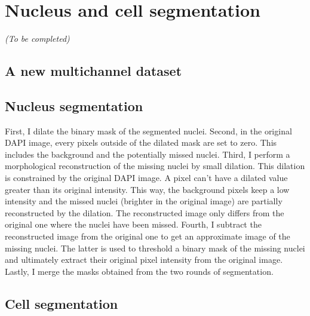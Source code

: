 \section{Nucleus and cell segmentation}
\label{sec:segmentation_nuc_cell}

\begin{center}
	\textit{(To be completed)}
\end{center}

\subsection{A new multichannel dataset}
\label{subsec:segmentation_data}


\subsection{Nucleus segmentation}
\label{subsec:segmentation_nuc}



First, I dilate the binary mask of the segmented nuclei.
Second, in the original DAPI image, every pixels outside of the dilated mask are set to zero.
This includes the background and the potentially missed nuclei.
Third, I perform a morphological reconstruction of the missing nuclei by small dilation.
This dilation is constrained by the original DAPI image.
A pixel can't have a dilated value greater than its original intensity.
This way, the background pixels keep a low intensity and the missed nuclei (brighter in the original image) are partially reconstructed by the dilation.
The reconstructed image only differs from the original one where the nuclei have been missed.
Fourth, I subtract the reconstructed image from the original one to get an approximate image of the missing nuclei.
The latter is used to threshold a binary mask of the missing nuclei and ultimately extract their original pixel intensity from the original image.
Lastly, I merge the masks obtained from the two rounds of segmentation.

\subsection{Cell segmentation}
\label{subsec:segmentation_cell}


